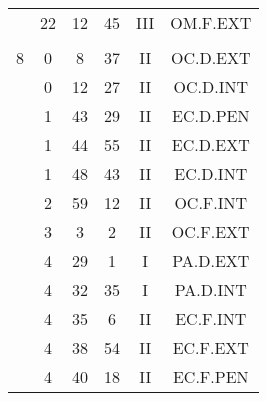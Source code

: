 \documentclass[12pt, a4paper]{article}
\begin{document}
\begin{multicols}{3}
{\begin{tabular}{c c c c c c}
	 	 	 	 & 22 & 12 & 45 & III & OM.F.EXT\\%
	 	 	 	 & & & & & \\%
	 	 	 	8 & 0 & 8 & 37 & II & OC.D.EXT\\%
	 	 	 	 & 0 & 12 & 27 & II & OC.D.INT\\%
	 	 	 	 & 1 & 43 & 29 & II & EC.D.PEN\\%
	 	 	 	 & 1 & 44 & 55 & II & EC.D.EXT\\%
	 	 	 	 & 1 & 48 & 43 & II & EC.D.INT\\%
	 	 	 	 & 2 & 59 & 12 & II & OC.F.INT\\%
	 	 	 	 & 3 & 3 & 2 & II & OC.F.EXT\\%
	 	 	 	 & 4 & 29 & 1 & I & PA.D.EXT\\%
	 	 	 	 & 4 & 32 & 35 & I & PA.D.INT\\%
	 	 	 	 & 4 & 35 & 6 & II & EC.F.INT\\%
	 	 	 	 & 4 & 38 & 54 & II & EC.F.EXT\\%
	 	 	 	 & 4 & 40 & 18 & II & EC.F.PEN\\%
	 	 \end{tabular}
 	}
\end{multicols}
\end{document}
